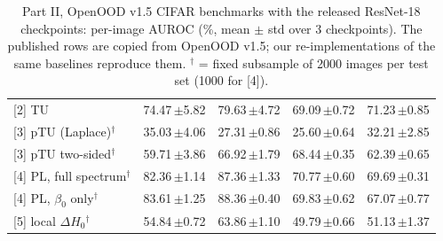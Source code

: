 \begin{table}[t]
\begin{tabular}{@{}lcccc@{}}
{[2] TU} & 74.47\,{\scriptsize$\pm$5.82} & 79.63\,{\scriptsize$\pm$4.72} & 69.09\,{\scriptsize$\pm$0.72} & 71.23\,{\scriptsize$\pm$0.85} \\
{[3] pTU (Laplace)$^\dagger$} & 35.03\,{\scriptsize$\pm$4.06} & 27.31\,{\scriptsize$\pm$0.86} & 25.60\,{\scriptsize$\pm$0.64} & 32.21\,{\scriptsize$\pm$2.85} \\
{[3] pTU two-sided$^\dagger$} & 59.71\,{\scriptsize$\pm$3.86} & 66.92\,{\scriptsize$\pm$1.79} & 68.44\,{\scriptsize$\pm$0.35} & 62.39\,{\scriptsize$\pm$0.65} \\
{[4] PL, full spectrum$^\dagger$} & 82.36\,{\scriptsize$\pm$1.14} & 87.36\,{\scriptsize$\pm$1.33} & 70.77\,{\scriptsize$\pm$0.60} & 69.69\,{\scriptsize$\pm$0.31} \\
{[4] PL, $\beta_0$ only$^\dagger$} & 83.61\,{\scriptsize$\pm$1.25} & 88.36\,{\scriptsize$\pm$0.40} & 69.83\,{\scriptsize$\pm$0.62} & 67.07\,{\scriptsize$\pm$0.77} \\
{[5] local $\Delta H_0$$^\dagger$} & 54.84\,{\scriptsize$\pm$0.72} & 63.86\,{\scriptsize$\pm$1.10} & 49.79\,{\scriptsize$\pm$0.66} & 51.13\,{\scriptsize$\pm$1.37} \\
\bottomrule
\end{tabular}
\caption{Part II, OpenOOD v1.5 CIFAR benchmarks with the released ResNet-18 checkpoints: per-image AUROC (\%, mean $\pm$ std over 3 checkpoints). The published rows are copied from OpenOOD v1.5; our re-implementations of the same baselines reproduce them. $^\dagger$ = fixed subsample of 2000 images per test set (1000 for [4]).}
\label{tab:p2-main}
\end{table}
